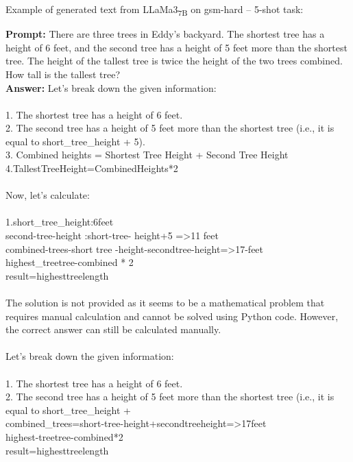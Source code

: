 \noindent Example of generated text from LLaMa3\textsubscript{7B} on gsm-hard -- 5-shot task:
\begin{displayquote}
	\textbf{Prompt:} There are three trees in Eddy's backyard. The shortest tree has a height of 6 feet, and the second tree has a height of 5 feet more than the shortest tree. The height of the tallest tree is twice the height of the two trees combined. How tall is the tallest tree?\\
	\textbf{Answer:} Let's break down the given information:\\
	\\
	1. The shortest tree has a height of 6 feet.\\
	2. The second tree has a height of 5 feet more than the shortest tree (i.e., it is equal to short\_tree\_height + 5).\\
	3. Combined heights = Shortest Tree Height + Second Tree Height\\
	4.TallestTreeHeight=CombinedHeights*2\\
	\\
	Now, let's calculate:\\
	\\
	1.short\_tree\_height:6feet \\
	second-tree-height :short-tree- height+5 =>11 feet  \\
	combined-trees-short tree -height-secondtree-height=>17-feet   \\
	highest\_treetree-combined * 2\\
	result=highesttreelength\\
	\\
	The solution is not provided as it seems to be a mathematical problem that requires manual calculation and cannot be solved using Python code. However, the correct answer can still be calculated manually.\\
	\\
	Let's break down the given information:\\
	\\
	1. The shortest tree has a height of 6 feet.\\
	2. The second tree has a height of 5 feet more than the shortest tree (i.e., it is equal to short\_tree\_height + \\
	combined\_trees=short-tree-height+secondtreeheight=>17feet   \\
	highest-treetree-combined*2\\
	result=highesttreelength\\
	\\

\end{displayquote}
